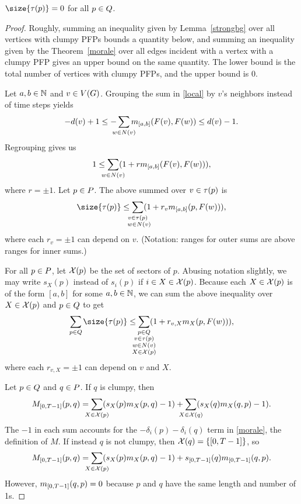 \begin{thm}\label{nct}
$\size{\pfpverts{p}} = 0$ for all $p \in \cpfps$.
\end{thm}

\begin{proof}
Roughly, summing an inequality given by Lemma~\ref{strongbg} over all vertices
with clumpy PFPs bounds a quantity below, and summing an inequality given by
the Theorem~\ref{morale} over all edges incident with a vertex with a clumpy
PFP gives an upper bound on the same quantity. The lower bound is the total
number of vertices with clumpy PFPs, and the upper bound is 0.

Let $a,b \in \mathbb{N}$ and $v \in V(G)$. Grouping the sum in \eqref{local} by $v$'s
neighbors instead of time steps yields
\[
  -\deg{v} + 1 \leq -\smashoperator{\sum_{w \in
      \N{v}}}\misb{[a,b]}{\pfp{v}}{\pfp{w}} \leq \deg{v} - 1.
\]
Regrouping gives us
\[
  1 \leq \smashoperator{\sum_{w \in \N{v}}}(1 +
  r\misb{[a,b]}{\pfp{v}}{\pfp{w}}),
\]
where $r = \pm1$. Let $p \in \pfps$. The above summed over $v \in \pfpverts{p}$
is
\[
  \size{\pfpverts{p}} \leq \smashoperator{\sum_{\substack{v \in \pfpverts{p}
        \\\ w \in \N{v}}}}(1 + r_v\misb{[a,b]}{p}{\pfp{w}}),
\]
where each $r_v = \pm1$ can depend on $v$. (Notation: ranges for outer sums are
above ranges for inner sums.)

For all $p \in \pfps$, let $\mathcal{X}(p)$ be the set of sectors of $p$. Abusing
notation slightly, we may write $s_X(p)$ instead of $s_i(p)$ if $i \in X \in
\mathcal{X}(p)$. Because each $X \in \mathcal{X}(p)$ is of the form $[a,b]$ for some $a,b
\in \mathbb{N}$, we can sum the above inequality over $X \in \mathcal{X}(p)$ and $p \in
\cpfps$ to get
\begin{equation}\label{almost}
  \smashoperator[r]{\sum_{p \in \cpfps}}\size{\pfpverts{p}} \leq
  \smashoperator{\sum_{\substack{
        p \in \cpfps \\ v \in \pfpverts{p} \\
        w \in \N{v} \\ X \in \sctr{p}
  }}}(1 + r_{v,X}\misb{X}{p}{\pfp{w}}),
\end{equation}
where each $r_{v,X} = \pm1$ can depend on $v$ and $X$.

Let $p \in \cpfps$ and $q \in \pfps$. If $q$ is clumpy, then
\[
  M_{[0,\period-1]}(p,q) =
  \smashoperator{\sum_{X \in \sctr{p}}}(s_X(p)\misb{X}{p}{q} - 1) +
  \smashoperator{\sum_{X \in \sctr{q}}}(s_X(q)\misb{X}{q}{p} - 1).
\]
The $-1$ in each sum accounts for the $-\delta_i(p)-\delta_i(q)$ term in
\eqref{morale}, the definition of $M$. If instead $q$ is not clumpy, then
$\sctr{q} = \{[0,\period-1]\}$, so
\[
  M_{[0,\period-1]}(p,q) =
  \smashoperator{\sum_{X \in \sctr{p}}}(s_X(p)\misb{X}{p}{q} - 1) +
  s_{[0,\period-1]}(q)\misb{[0,\period-1]}{q}{p}.
\]
However, $\misb{[0,\period-1]}{q}{p} = 0$ because $p$ and $q$ have the same
length and number of 1s.


\end{proof}
